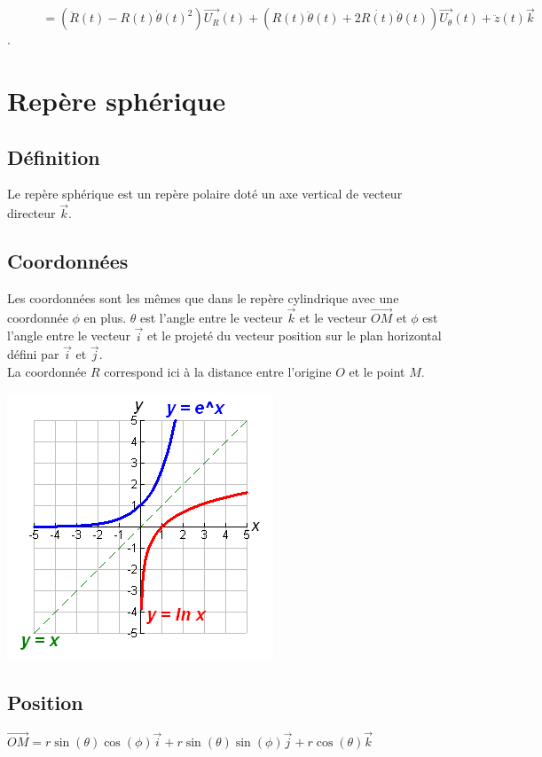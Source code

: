 \documentclass[a4paper,10pt]{book} %
\begin{document}
$\phantom{\overrightarrow{a}(t)}=(\ddot{R}(t)-R(t)\dot{\theta}(t)^2)\overrightarrow{U_R}(t)+(R(t)\ddot{\theta}(t)+2\dot{R(t)}\dot{\theta}(t))\overrightarrow{U_\theta}(t)+\ddot{z}(t)\overrightarrow{k}$.

\newpage

\section{Repère sphérique}
\subsection{Définition}
Le repère sphérique est un repère polaire doté un axe vertical de vecteur directeur $\overrightarrow{k}$.

\subsection{Coordonnées}
Les coordonnées sont les mêmes que dans le repère cylindrique avec une coordonnée $\phi$ en plus.
$\theta$ est l'angle entre le vecteur $\overrightarrow{k}$ et le vecteur $\overrightarrow{OM}$ et $\phi$ est l'angle entre le vecteur $\overrightarrow{i}$ et le projeté du vecteur position sur le plan horizontal défini par $\overrightarrow{i}$ et $\overrightarrow{j}$.\\
La coordonnée $R$ correspond ici à la distance entre l'origine $O$ et le point $M$.

\begin{center} \includegraphics[scale=0.7]{images/003.png} \end{center}

\subsection{Position}
$\overrightarrow{OM}=r\sin(\theta)\cos(\phi)\overrightarrow{i}+r\sin(\theta)\sin(\phi)\overrightarrow{j}+r\cos(\theta)\overrightarrow{k}$
\end{document}
